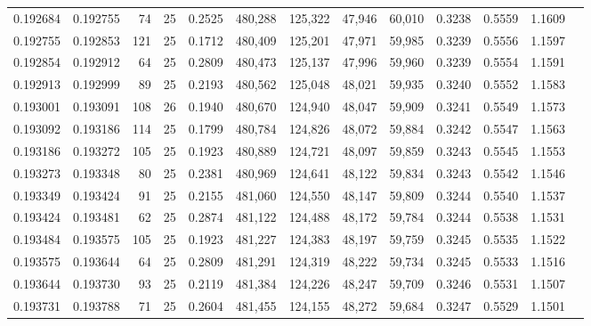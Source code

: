 \begin{tabular}{rrrrrrrrrrrrr}
0.192684 & 0.192755 &    74 &  25 &                                     0.2525 & 480,288 & 125,322 &  47,946 &  60,010 & 0.3238 & 0.5559 & 1.1609 \\
0.192755 & 0.192853 &   121 &  25 &                                     0.1712 & 480,409 & 125,201 &  47,971 &  59,985 & 0.3239 & 0.5556 & 1.1597 \\
0.192854 & 0.192912 &    64 &  25 &                                     0.2809 & 480,473 & 125,137 &  47,996 &  59,960 & 0.3239 & 0.5554 & 1.1591 \\
0.192913 & 0.192999 &    89 &  25 &                                     0.2193 & 480,562 & 125,048 &  48,021 &  59,935 & 0.3240 & 0.5552 & 1.1583 \\
0.193001 & 0.193091 &   108 &  26 &                                     0.1940 & 480,670 & 124,940 &  48,047 &  59,909 & 0.3241 & 0.5549 & 1.1573 \\
0.193092 & 0.193186 &   114 &  25 &                                     0.1799 & 480,784 & 124,826 &  48,072 &  59,884 & 0.3242 & 0.5547 & 1.1563 \\
0.193186 & 0.193272 &   105 &  25 &                                     0.1923 & 480,889 & 124,721 &  48,097 &  59,859 & 0.3243 & 0.5545 & 1.1553 \\
0.193273 & 0.193348 &    80 &  25 &                                     0.2381 & 480,969 & 124,641 &  48,122 &  59,834 & 0.3243 & 0.5542 & 1.1546 \\
0.193349 & 0.193424 &    91 &  25 &                                     0.2155 & 481,060 & 124,550 &  48,147 &  59,809 & 0.3244 & 0.5540 & 1.1537 \\
0.193424 & 0.193481 &    62 &  25 &                                     0.2874 & 481,122 & 124,488 &  48,172 &  59,784 & 0.3244 & 0.5538 & 1.1531 \\
0.193484 & 0.193575 &   105 &  25 &                                     0.1923 & 481,227 & 124,383 &  48,197 &  59,759 & 0.3245 & 0.5535 & 1.1522 \\
0.193575 & 0.193644 &    64 &  25 &                                     0.2809 & 481,291 & 124,319 &  48,222 &  59,734 & 0.3245 & 0.5533 & 1.1516 \\
0.193644 & 0.193730 &    93 &  25 &                                     0.2119 & 481,384 & 124,226 &  48,247 &  59,709 & 0.3246 & 0.5531 & 1.1507 \\
0.193731 & 0.193788 &    71 &  25 &                                     0.2604 & 481,455 & 124,155 &  48,272 &  59,684 & 0.3247 & 0.5529 & 1.1501 \\

\end{tabular}
